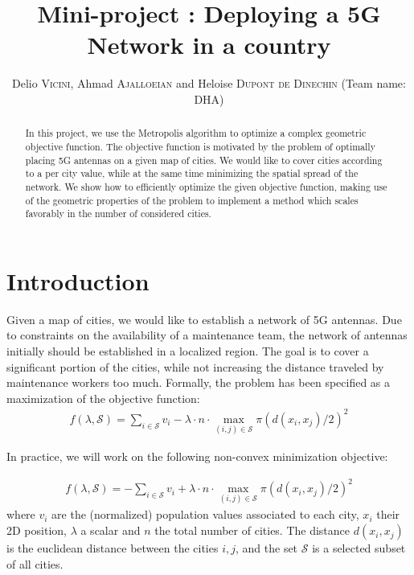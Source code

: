 \documentclass[conference,compsoc]{IEEEtran}
\newcommand{\selected}{\mathcal{S}} \newcommand{\newselected}{\hat{\mathcal{S}}}
\begin{document}
\title{\Large Mini-project : Deploying a 5G Network in a country }

\vspace{- 50 px}

\author{Delio \textsc{Vicini}, Ahmad \textsc{Ajalloeian} and Heloise
\textsc{Dupont de Dinechin} (Team name: DHA)\\
}

\maketitle
\begin{abstract}
  In this project, we use the Metropolis algorithm to optimize a complex
  geometric objective function. The objective function is motivated by the
  problem of optimally placing 5G antennas on a given map of cities. We would
  like to cover cities according to a per city value, while at the same time
  minimizing the spatial spread of the network. We show how to efficiently
  optimize the given objective function, making use of the geometric properties
  of the problem to implement a method which scales favorably in the number of
  considered cities.
\end{abstract}

\section{Introduction}
Given a map of cities, we would like to establish a network of 5G antennas. Due
to constraints on the availability of a maintenance team, the network of
antennas initially should be established in a localized region. The goal is to
cover a significant portion of the cities, while not increasing the distance
traveled by maintenance workers too much. Formally, the problem has been
specified as a maximization of the objective function:
\begin{align}
    f(\lambda, \selected) = \sum_{i \in \selected} v_i - \lambda \cdot n \cdot \max_{(i, j) \in \selected} \pi (d(x_i, x_j) /2) ^2
    \label{eq:objective}
\end{align}

In practice, we will work on the following non-convex minimization objective:

\begin{align}
    f(\lambda, \selected) = -\sum_{i \in \selected} v_i + \lambda \cdot n \cdot \max_{(i, j) \in \selected} \pi (d(x_i, x_j) /2) ^2
    \label{eq:objective}
\end{align}
where $v_i$ are the (normalized) population values associated to each city,
$x_i$ their 2D position, $\lambda$ a scalar and $n$ the total number of cities.
The distance $d(x_i, x_j)$ is the euclidean distance between the cities $i, j$,
and the set $\selected$ is a selected subset of all cities.
\end{document}
